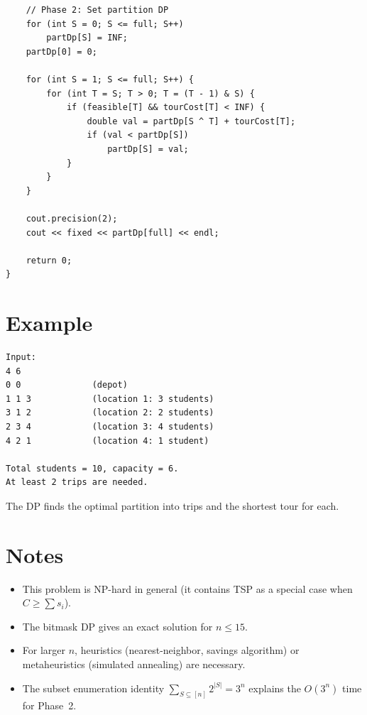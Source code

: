 \documentclass[11pt,a4paper]{article}
\begin{document}
\begin{lstlisting}
    // Phase 2: Set partition DP
    for (int S = 0; S <= full; S++)
        partDp[S] = INF;
    partDp[0] = 0;

    for (int S = 1; S <= full; S++) {
        for (int T = S; T > 0; T = (T - 1) & S) {
            if (feasible[T] && tourCost[T] < INF) {
                double val = partDp[S ^ T] + tourCost[T];
                if (val < partDp[S])
                    partDp[S] = val;
            }
        }
    }

    cout.precision(2);
    cout << fixed << partDp[full] << endl;

    return 0;
}
\end{lstlisting}

\section{Example}

\begin{verbatim}
Input:
4 6
0 0              (depot)
1 1 3            (location 1: 3 students)
3 1 2            (location 2: 2 students)
2 3 4            (location 3: 4 students)
4 2 1            (location 4: 1 student)

Total students = 10, capacity = 6.
At least 2 trips are needed.
\end{verbatim}

The DP finds the optimal partition into trips and the shortest tour for each.

\section{Notes}

\begin{itemize}
  \item This problem is NP-hard in general (it contains TSP as a special case
    when $C \ge \sum s_i$).
  \item The bitmask DP gives an exact solution for $n \le 15$.
  \item For larger $n$, heuristics (nearest-neighbor, savings algorithm) or
    metaheuristics (simulated annealing) are necessary.
  \item The subset enumeration identity $\sum_{S \subseteq [n]} 2^{|S|} = 3^n$
    explains the $O(3^n)$ time for Phase~2.
\end{itemize}
\end{document}
